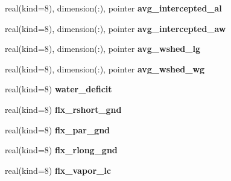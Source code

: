 \begin{DoxyCompactItemize}
\item 
\hypertarget{structrk4__coms_1_1rk4patchtype_a285a8c7d73076db31f32b50c2317a118}{
real(kind=8), dimension(:), pointer {\bfseries avg\_\-intercepted\_\-al}}
\label{structrk4__coms_1_1rk4patchtype_a285a8c7d73076db31f32b50c2317a118}

\item 
\hypertarget{structrk4__coms_1_1rk4patchtype_a4ed605d75f28c34e50e020e6e6d4af90}{
real(kind=8), dimension(:), pointer {\bfseries avg\_\-intercepted\_\-aw}}
\label{structrk4__coms_1_1rk4patchtype_a4ed605d75f28c34e50e020e6e6d4af90}

\item 
\hypertarget{structrk4__coms_1_1rk4patchtype_a1dddf3dbd1b0fb031d376f3eb53ef3e2}{
real(kind=8), dimension(:), pointer {\bfseries avg\_\-wshed\_\-lg}}
\label{structrk4__coms_1_1rk4patchtype_a1dddf3dbd1b0fb031d376f3eb53ef3e2}

\item 
\hypertarget{structrk4__coms_1_1rk4patchtype_a28d745e74cb2d510eea8cbf1408f0df2}{
real(kind=8), dimension(:), pointer {\bfseries avg\_\-wshed\_\-wg}}
\label{structrk4__coms_1_1rk4patchtype_a28d745e74cb2d510eea8cbf1408f0df2}

\item 
\hypertarget{structrk4__coms_1_1rk4patchtype_ad400e8bf08adaf165b7da72714df2dd2}{
real(kind=8) {\bfseries water\_\-deficit}}
\label{structrk4__coms_1_1rk4patchtype_ad400e8bf08adaf165b7da72714df2dd2}

\item 
\hypertarget{structrk4__coms_1_1rk4patchtype_ad3a9ac2010ae5cea9c66c604a40c9e48}{
real(kind=8) {\bfseries flx\_\-rshort\_\-gnd}}
\label{structrk4__coms_1_1rk4patchtype_ad3a9ac2010ae5cea9c66c604a40c9e48}

\item 
\hypertarget{structrk4__coms_1_1rk4patchtype_a4a63ab39f543f5e00ac25c133f7f99e2}{
real(kind=8) {\bfseries flx\_\-par\_\-gnd}}
\label{structrk4__coms_1_1rk4patchtype_a4a63ab39f543f5e00ac25c133f7f99e2}

\item 
\hypertarget{structrk4__coms_1_1rk4patchtype_a3660bfc56837714eb2e040dd7dac6899}{
real(kind=8) {\bfseries flx\_\-rlong\_\-gnd}}
\label{structrk4__coms_1_1rk4patchtype_a3660bfc56837714eb2e040dd7dac6899}

\item 
\hypertarget{structrk4__coms_1_1rk4patchtype_a55d7ddf118ee323101038bf3b29a6957}{
real(kind=8) {\bfseries flx\_\-vapor\_\-lc}}
\label{structrk4__coms_1_1rk4patchtype_a55d7ddf118ee323101038bf3b29a6957}


\end{DoxyCompactItemize}
